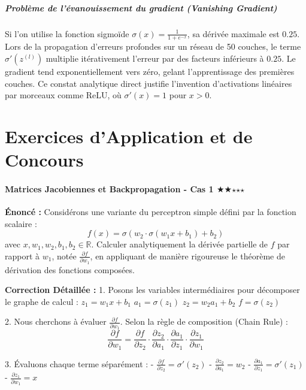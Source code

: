 \documentclass[11pt,a4paper]{article}
\begin{document}
\subsubsection{Problème de l'évanouissement du gradient (Vanishing Gradient)}
Si l'on utilise la fonction sigmoïde $\sigma(x) = \frac{1}{1+e^{-x}}$, sa dérivée maximale est $0.25$.
Lors de la propagation d'erreurs profondes sur un réseau de 50 couches, le terme $\sigma'(z^{(l)})$ multiplie itérativement l'erreur par des facteurs inférieurs à $0.25$. Le gradient tend exponentiellement vers zéro, gelant l'apprentissage des premières couches. Ce constat analytique direct justifie l'invention d'activations linéaires par morceaux comme ReLU, où $\sigma'(x) = 1$ pour $x > 0$.

\newpage
\part{Exercices d'Application et de Concours}
\subsection*{Matrices Jacobiennes et Backpropagation - Cas 1 $\bigstar$$\bigstar$$\star$$\star$$\star$}

\textbf{Énoncé :}
Considérons une variante du perceptron simple défini par la fonction scalaire :
$$ f(x) = \sigma(w_{2} \cdot \sigma(w_{1} x + b_{1}) + b_{2}) $$
avec $x, w_{1}, w_{2}, b_{1}, b_{2} \in \mathbb{R}$.
Calculer analytiquement la dérivée partielle de $f$ par rapport à $w_{1}$, notée $\frac{{\partial f}}{{\partial w_{1}}}$, en appliquant de manière rigoureuse le théorème de dérivation des fonctions composées.

\textbf{Correction Détaillée :}
1. Posons les variables intermédiaires pour décomposer le graphe de calcul :
   $z_1 = w_{1} x + b_{1}$
   $a_1 = \sigma(z_1)$
   $z_2 = w_{2} a_1 + b_{2}$
   $f = \sigma(z_2)$

2. Nous cherchons à évaluer $\frac{{\partial f}}{{\partial w_{1}}}$. Selon la règle de composition (Chain Rule) :
   $$ \frac{{\partial f}}{{\partial w_{1}}} = \frac{{\partial f}}{{\partial z_2}} \cdot \frac{{\partial z_2}}{{\partial a_1}} \cdot \frac{{\partial a_1}}{{\partial z_1}} \cdot \frac{{\partial z_1}}{{\partial w_{1}}} $$

3. Évaluons chaque terme séparément :
   - $\frac{{\partial f}}{{\partial z_2}} = \sigma'(z_2)$
   - $\frac{{\partial z_2}}{{\partial a_1}} = w_{2}$
   - $\frac{{\partial a_1}}{{\partial z_1}} = \sigma'(z_1)$
   - $\frac{{\partial z_1}}{{\partial w_{1}}} = x$
\end{document}
